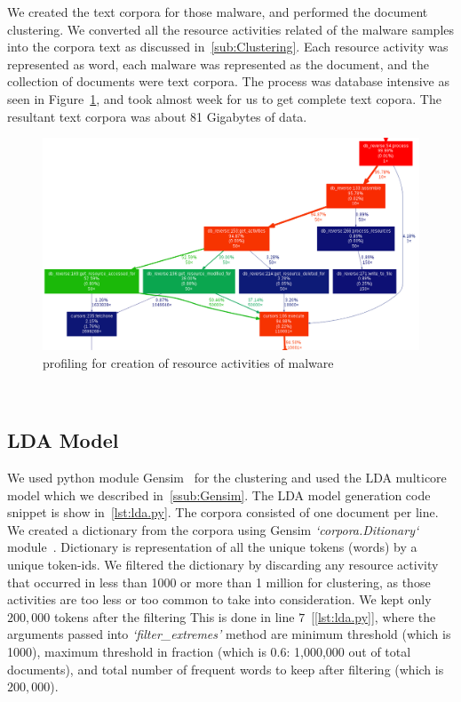 We created the text corpora for those {\gettotalmalwareiii{}} malware, and performed the document clustering.
We converted all the resource activities related of the malware samples into the corpora text as discussed in~\autoref{sub:Clustering}.
Each resource activity was represented as word, each malware was represented as the document, and the collection of documents were text corpora.
The process was database intensive as seen in Figure~\ref{fig:actcreation}, and took almost week for us to get complete text copora.
The resultant text corpora was about 81 Gigabytes of data.
\begin{figure}
\begin{center}
  \includegraphics[scale=0.4]{figures/activities_creation.png}
\end{center}
\caption{profiling for creation of resource activities of malware}
\label{fig:actcreation}
\end{figure}
\\
\subsection{LDA Model}
\label{sub:LDA Model}
We used python module Gensim~\cite[Gensim]{gensim}  for the clustering and used the LDA multicore model which we described in~\autoref{ssub:Gensim}.
The LDA model generation code snippet is show in~\autoref{lst:lda.py}.
The corpora consisted of one document per line.
We created a dictionary from the corpora using Gensim \emph{`corpora.Ditionary`} module~\cite[]{gensimdict}.
Dictionary is representation of all the unique tokens (words) by a unique token-ids.
We filtered the dictionary by discarding any resource activity that occurred in less than 1000 or more than 1 million for clustering, as those activities are too less or too common to take into consideration.
We kept only $200,000$ tokens after the filtering 
This is done in line $7$~[\autoref{lst:lda.py}], where the arguments passed into \emph{`filter\_extremes'} method are minimum threshold (which is 1000), maximum threshold in fraction (which is $0.6$: 1,000,000 out of total \gettotalmalwareii{} documents), and total number of frequent words to keep after filtering (which is $200,000$).

